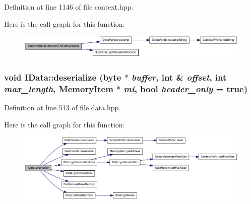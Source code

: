 Definition at line 1146 of file context.hpp.

Here is the call graph for this function:\nopagebreak
\begin{figure}[H]
\begin{center}
\leavevmode
\includegraphics[width=360pt]{class_i_data_a1abf008f5376563bffe458d81033efde_cgraph}
\end{center}
\end{figure}
\hypertarget{class_i_data_a1ab1fff22b5ba4cd4fb93cd09007dda6}{
\subsubsection[{deserialize}]{\setlength{\rightskip}{0pt plus 5cm}void IData::deserialize ({\bf byte} $\ast$ {\em buffer}, \/  int \& {\em offset}, \/  int {\em max\_\-length}, \/  {\bf MemoryItem} $\ast$ {\em mi}, \/  bool {\em header\_\-only} = {\ttfamily true})}}
\label{class_i_data_a1ab1fff22b5ba4cd4fb93cd09007dda6}


Definition at line 513 of file data.hpp.

Here is the call graph for this function:\nopagebreak
\begin{figure}[H]
\begin{center}
\leavevmode
\includegraphics[width=407pt]{class_i_data_a1ab1fff22b5ba4cd4fb93cd09007dda6_cgraph}
\end{center}
\end{figure}


